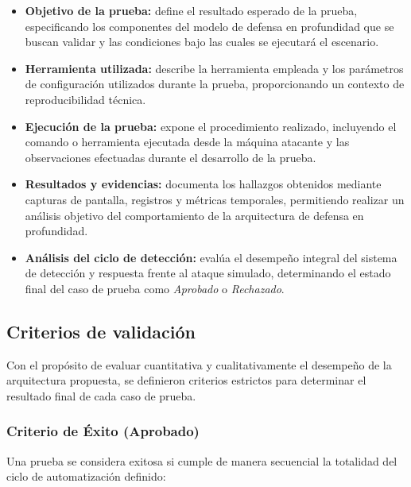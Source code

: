 \begin{itemize}
    \item \textbf{Objetivo de la prueba:} define el resultado esperado de la prueba, especificando los componentes del modelo de defensa en profundidad que se buscan validar y las condiciones bajo las cuales se ejecutará el escenario.
    
    \item \textbf{Herramienta utilizada:} describe la herramienta empleada y los parámetros de configuración utilizados durante la prueba, proporcionando un contexto de reproducibilidad técnica.
    
    \item \textbf{Ejecución de la prueba:} expone el procedimiento realizado, incluyendo el comando o herramienta ejecutada desde la máquina atacante y las observaciones efectuadas durante el desarrollo de la prueba.
    
    \item \textbf{Resultados y evidencias:} documenta los hallazgos obtenidos mediante capturas de pantalla, registros y métricas temporales, permitiendo realizar un análisis objetivo del comportamiento de la arquitectura de defensa en profundidad.
    
    \item \textbf{Análisis del ciclo de detección:} evalúa el desempeño integral del sistema de detección y respuesta frente al ataque simulado, determinando el estado final del caso de prueba como \textit{Aprobado} o \textit{Rechazado}.
\end{itemize}

\subsection{Criterios de validación}
\noindent

Con el propósito de evaluar cuantitativa y cualitativamente el desempeño de la arquitectura propuesta, se definieron criterios estrictos 
para determinar el resultado final de cada caso de prueba.

\subsubsection{Criterio de Éxito (Aprobado)}

Una prueba se considera exitosa si cumple de manera secuencial la totalidad del ciclo de automatización definido:

